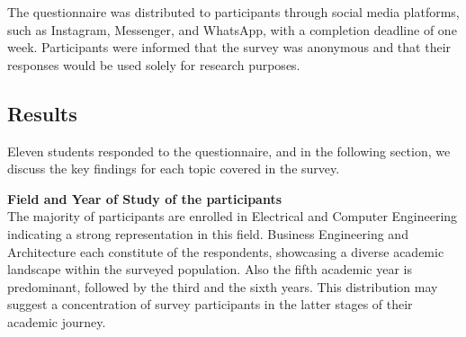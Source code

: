 \noindent The questionnaire was distributed to participants through social media platforms, such as Instagram, Messenger, and WhatsApp, with a completion deadline of one week. Participants were informed that the survey was anonymous and that their responses would be used solely for research purposes.

\subsection{Results}
Eleven students responded to the questionnaire, and in the following section, we discuss the key findings for each topic covered in the survey.

\vspace{5mm}

\noindent \textbf{Field and Year of Study of the participants} \\
The majority of participants are enrolled in Electrical and Computer Engineering indicating a strong representation in this field. Business Engineering and Architecture each constitute of the respondents, showcasing a diverse academic landscape within the surveyed population. Also the fifth academic year is predominant, followed by the third and the sixth years. This distribution may suggest a concentration of survey participants in the latter stages of their academic journey.

\vspace{5mm}

